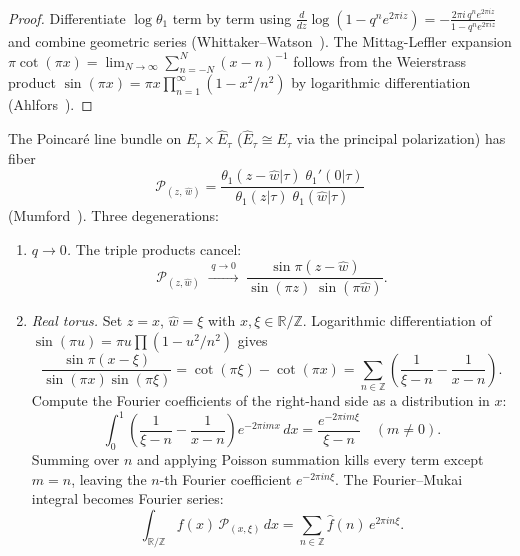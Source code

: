 \begin{proof}
Differentiate $\log\theta_1$
term by term using $\frac{d}{dz}\log(1-q^ne^{2\pi iz})
= -\frac{2\pi i\,q^n e^{2\pi iz}}{1-q^n e^{2\pi iz}}$
and combine geometric series
(Whittaker--Watson~\cite[\S21.3]{WW27}).
The Mittag-Leffler expansion
$\pi\cot(\pi x)
= \lim_{N\to\infty}\sum_{n=-N}^{N}(x-n)^{-1}$
follows from the Weierstrass product
$\sin(\pi x) = \pi x\prod_{n=1}^{\infty}(1-x^2/n^2)$
by logarithmic differentiation
(Ahlfors~\cite[\S5.2]{Ahlfors79}).
\end{proof}

\begin{proposition}
\label{prop:fourier-poincare-degeneration}
The Poincar\'e line bundle on
$E_\tau \times \widehat{E}_\tau$
\textup{(}$\widehat{E}_\tau \cong E_\tau$ via the principal
polarization\textup{)} has fiber
\begin{equation}\label{eq:fourier-poincare-fiber}
\mathcal{P}_{(z,\,\hat{w})}
= \frac{\theta_1(z - \hat{w}|\tau)\;\theta_1'(0|\tau)}
       {\theta_1(z|\tau)\;\theta_1(\hat{w}|\tau)}
\end{equation}
\textup{(}Mumford~\textup{\cite[\S I.2]{Mum70}}\textup{)}.
Three degenerations:
\begin{enumerate}
\item \emph{$q \to 0$.}
  The triple products cancel:
  \begin{equation}\label{eq:fourier-poincare-degen-Gm}
  \mathcal{P}_{(z,\hat{w})}
  \;\xrightarrow{\;q \to 0\;}\;
  \frac{\sin\pi(z - \hat{w})}
       {\sin(\pi z)\;\sin(\pi\hat{w})}.
  \end{equation}

\item \emph{Real torus.}
  Set $z = x$, $\hat{w} = \xi$ with
  $x,\xi \in \mathbb{R}/\mathbb{Z}$.  Logarithmic differentiation
  of $\sin(\pi u) = \pi u\prod(1-u^2/n^2)$ gives
  \begin{equation}\label{eq:fourier-sine-product}
  \frac{\sin\pi(x - \xi)}{\sin(\pi x)\sin(\pi\xi)}
  = \cot(\pi\xi) - \cot(\pi x)
  = \sum_{n \in \mathbb{Z}}
    \!\left(\frac{1}{\xi - n} - \frac{1}{x - n}\right).
  \end{equation}
  Compute the Fourier coefficients of the right-hand side as a
  distribution in $x$:
  \[
  \int_0^1
    \left(\frac{1}{\xi - n} - \frac{1}{x - n}\right)
    e^{-2\pi i mx}\,dx
  = \frac{e^{-2\pi i m\xi}}{\xi - n}
    \quad (m \neq 0).
  \]
  Summing over $n$ and applying Poisson summation kills every term
  except $m = n$, leaving the $n$-th Fourier coefficient
  $e^{-2\pi in\xi}$.  The Fourier--Mukai integral becomes
  Fourier series:
  \begin{equation}\label{eq:fourier-series-from-FM}
  \int_{\mathbb{R}/\mathbb{Z}} f(x)\,
    \mathcal{P}_{(x,\xi)}\,dx
  = \sum_{n \in \mathbb{Z}} \hat{f}(n)\,e^{2\pi i n\xi}.
  \end{equation}


\end{enumerate}
\end{proposition}
